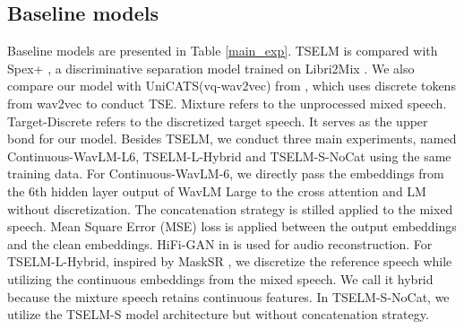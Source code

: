 \documentclass[conference]{IEEEtran}
\begin{document}
\subsection{Baseline models}
Baseline models are presented in Table \ref{main_exp}. 
TSELM is compared with Spex+ \cite{spex_plus}, a discriminative separation model trained on Libri2Mix \cite{librimix}. 
We also compare our model with UniCATS(vq-wav2vec) from \cite{gen_tse}, which uses discrete tokens from wav2vec to conduct TSE. 
Mixture refers to the unprocessed mixed speech. 
Target-Discrete refers to the discretized target speech. 
It serves as the upper bond for our model.  Besides TSELM, we conduct three main experiments, named
 Continuous-WavLM-L6, TSELM-L-Hybrid and TSELM-S-NoCat using the same training data. 
For Continuous-WavLM-6, we directly
pass the embeddings from the 6th hidden layer output of WavLM Large to the cross attention  
and LM without discretization. 
The concatenation strategy is stilled applied to the mixed speech. Mean Square Error (MSE) loss is applied between the output embeddings and the clean 
embeddings. HiFi-GAN in \cite{knn_vc} is used for audio reconstruction. For 
TSELM-L-Hybrid, inspired by MaskSR \cite{mask_sr}, we discretize the reference 
speech while utilizing the continuous embeddings from the mixed speech. We call 
it hybrid because the mixture speech retains continuous features. In TSELM-S-NoCat, we utilize the TSELM-S model architecture but without concatenation strategy. 
\end{document}
